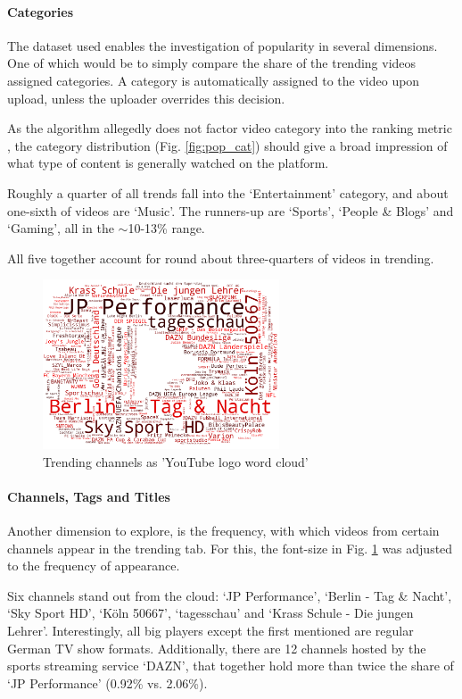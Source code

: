 \documentclass{article}
\begin{document}
\paragraph{Categories} The dataset used enables the investigation of popularity in several dimensions. One of which would be to simply compare the share of the trending videos assigned categories. A category is automatically assigned to the video upon upload, unless the uploader overrides this decision.

As the algorithm allegedly does not factor video category into the ranking metric \cite{cat_legacy}, the category distribution (Fig. \ref{fig:pop_cat}) should give a broad impression of what type of content is generally watched on the platform.

Roughly a quarter of all trends fall into the `Entertainment' category, and about one-sixth of videos are `Music'. The runners-up are `Sports', `People \& Blogs' and `Gaming', all in the $\sim$10-13\% range. 

All five together account for round about three-quarters of videos in trending.

\begin{figure}[h]
    \centering
    \includegraphics[width=0.625\textwidth]{fig/channels_wordcloud_nice.png}
    \caption{Trending channels as 'YouTube logo word cloud'}
    \label{fig:wc_channels}
\end{figure}

\paragraph{Channels, Tags and Titles} Another dimension to explore, is the frequency, with which videos from certain channels appear in the trending tab. For this, the font-size in Fig. \ref{fig:wc_channels} was adjusted to the frequency of appearance.

Six channels stand out from the cloud: `JP Performance', `Berlin - Tag \& Nacht', `Sky Sport HD', `Köln 50667', `tagesschau' and `Krass Schule - Die jungen Lehrer'. Interestingly, all big players except the first mentioned are regular German TV show formats. Additionally, there are 12 channels hosted by the sports streaming service `DAZN', that together hold more than twice the share of `JP Performance' (0.92\% vs. 2.06\%).
\end{document}
